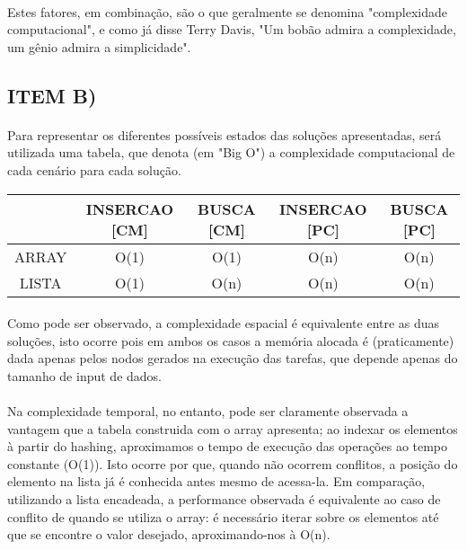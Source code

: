 \documentclass[12pt, letterpaper]{article}
\begin{document}
\paragraph{}
Estes fatores, em combinação, são o que geralmente se denomina "complexidade computacional",
e como já disse Terry Davis, "Um bobão admira a complexidade,
um gênio admira a simplicidade".

\subsection{ITEM B)}
\paragraph{}
Para representar os diferentes possíveis estados das soluções apresentadas, será utilizada
uma tabela, que denota (em "Big O") a complexidade computacional de cada cenário para
cada solução.

\begin{center}
\begin{tabular}{ | c | c | c | c | c | }
 \hline
    & INSERCAO [CM] & BUSCA [CM] & INSERCAO [PC] & BUSCA [PC] \\
 \hline\hline
    ARRAY & O(1) & O(1) & O(n) & O(n) \\
    LISTA & O(1) & O(n) & O(n) & O(n) \\
\hline
\end{tabular}
\end{center}

\paragraph{}
Como pode ser observado, a complexidade espacial é equivalente entre as duas soluções,
isto ocorre pois em ambos os casos a memória alocada é (praticamente) dada apenas pelos
nodos gerados na execução das tarefas, que depende apenas do tamanho de input de dados.

\paragraph{}
Na complexidade temporal, no entanto, pode ser claramente observada a vantagem que a tabela
construida com o array apresenta; ao indexar os elementos à partir do hashing, aproximamos
o tempo de execução das operações ao tempo constante (O(1)). Isto ocorre por que, quando
não ocorrem conflitos, a posição do elemento na lista já é conhecida antes mesmo de
acessa-la. Em comparação, utilizando a lista encadeada, a performance observada é
equivalente ao caso de conflito de quando se utiliza o array: é necessário iterar sobre
os elementos até que se encontre o valor desejado, aproximando-nos à O(n).
\end{document}
